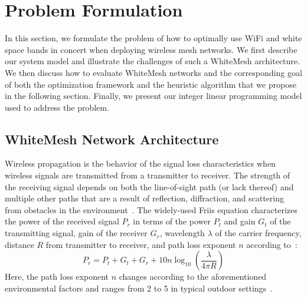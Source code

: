 \section{Problem Formulation}
\label{sec:problemformulation}

%

In this section, we formulate the problem of how to optimally 
use WiFi and white space bands in concert when deploying wireless 
mesh networks.  We first describe our system model and illustrate 
the challenges of such a WhiteMesh architecture.  We then discuss
how to evaluate WhiteMesh networks and the corresponding goal of
both the optimization framework and the heuristic algorithm that 
we propose in the following section.  Finally, we present 
our integer linear programming model used to address the problem. 
 
\subsection{WhiteMesh Network Architecture}
\label{subsec:architecture}

Wireless propagation is the behavior of the signal loss characteristics 
when wireless signals are transmitted from a transmitter to receiver.
The strength of the receiving signal depends on both the line-of-sight
path (or lack thereof) and multiple other paths that are a result of 
reflection, diffraction, and scattering from obstacles in the 
environment~\cite{andersen1995propagation}. The widely-used Friis
equation characterizes the power of the received signal $P_r$ in terms 
of the power $P_t$ and gain $G_t$ of the transmitting signal, gain of 
the receiver $G_r$, wavelength $\lambda$ of the carrier frequency, 
distance $R$ from transmitter to receiver, and path loss exponent $n$ according 
to~\cite{friis}:
\begin{equation}
\label{eq:friis}
P_r=P_t+G_t+G_r+10n \log_{10}\left( \frac{\lambda}{4\pi R}\right)
\end{equation}
Here, the path loss exponent $n$ changes according to the
aforementioned environmental factors and ranges from 2 to 5 in typical
outdoor settings~\cite{rappaport}.


